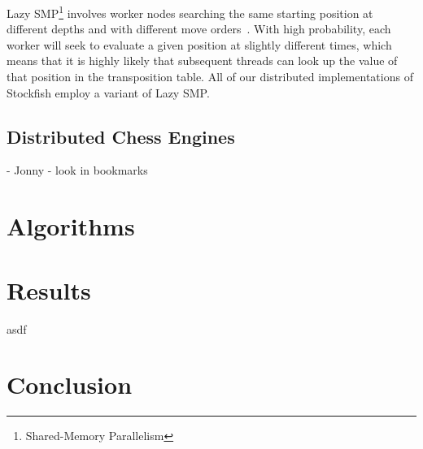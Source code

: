 \documentclass{article}
\begin{document}
Lazy SMP\footnote{Shared-Memory Parallelism} involves worker nodes searching the
same starting position at different depths and with different move
orders~\cite{LazySMP}.
With high probability, each worker will seek to evaluate a given position at
slightly different times, which means that it is highly likely that subsequent
threads can look up the value of that position in the transposition table. All
of our distributed implementations of Stockfish employ a variant of Lazy SMP.

\subsection{Distributed Chess Engines}
- Jonny
- look in bookmarks

\section{Algorithms} \label{Algorithms}

\section{Results} \label{Results}
asdf

\section{Conclusion}


\pagebreak
\pagestyle{empty}



\end{document}
